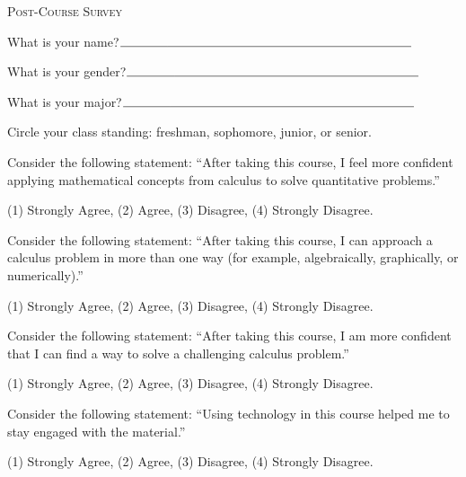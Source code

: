 \documentclass[11pt]{article}
\begin{document}
\begin{center}
\Large{\textsc{Post-Course Survey }}\\
\end{center}

\vspace{.2cm}

\begin{enumerate}[{$\qquad 1.]$}]
\item What is your name?$\line(1,0){38}\line(1,0){195}$
\item What is your gender?$\line(1,0){38}\line(1,0){195}$
\item What is your major?$\line(1,0){38}\line(1,0){195}$
\item Circle your class standing: freshman, sophomore, junior, or senior. 


\item Consider the following statement: ``After taking this course, I feel more confident applying mathematical concepts from calculus to solve quantitative problems.''
\begin{center} 
(1) Strongly Agree, \qquad (2) Agree, \qquad (3) Disagree, \qquad (4) Strongly Disagree. \end{center}

\item Consider the following statement: ``After taking this course, I can approach a calculus problem in more than one way (for example, algebraically, graphically, or numerically).''
\begin{center} 
(1) Strongly Agree, \qquad (2) Agree, \qquad (3) Disagree, \qquad (4) Strongly Disagree. \end{center}

\item Consider the following statement: ``After taking this course, I am more confident that I can find a way to solve a challenging calculus problem.''
\begin{center} 
(1) Strongly Agree, \qquad (2) Agree, \qquad (3) Disagree, \qquad (4) Strongly Disagree. \end{center}


\item Consider the following statement: ``Using technology in this course helped me to stay engaged with the material.''
\begin{center}
(1) Strongly Agree, \qquad (2) Agree, \qquad (3) Disagree, \qquad (4) Strongly Disagree. \end{center}


\end{enumerate}
\end{document}
